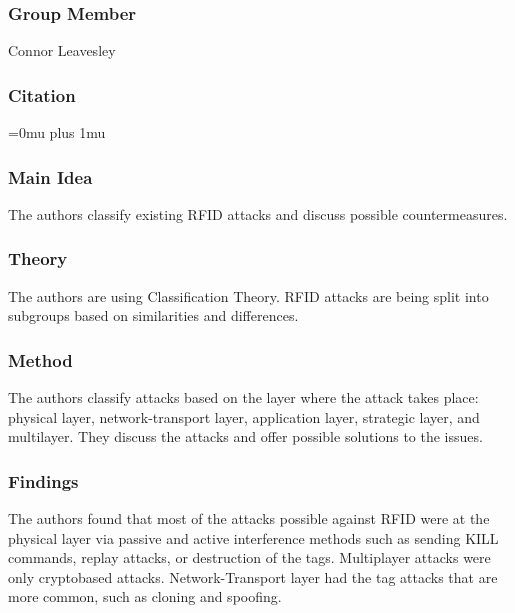 \subsubsection{Group Member}

\noindent
Connor Leavesley

\noindent
\subsubsection{Citation}

\Urlmuskip=0mu plus 1mu\relax

\subsubsection{Main Idea}

\noindent
The authors classify existing RFID attacks and discuss possible countermeasures.

\subsubsection{Theory}

\noindent
The authors are using Classification Theory. RFID attacks are being split into subgroups based on similarities and differences. 

\subsubsection{Method}

\noindent
The authors classify attacks based on the layer where the attack takes place: physical layer, network-transport layer, application layer, strategic layer, and multilayer. They discuss the attacks and offer possible solutions to the issues. 

\subsubsection{Findings}

\noindent
The authors found that most of the attacks possible against RFID were at the physical layer via passive and active interference methods such as sending KILL commands, replay attacks, or destruction of the tags. Multiplayer attacks were only cryptobased attacks. Network-Transport layer had the tag attacks that are more common, such as cloning and spoofing. 

